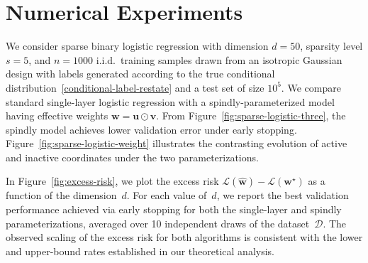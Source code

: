 \documentclass{article}
\theoremstyle{plain}
\theoremstyle{definition}
\theoremstyle{remark}
\begin{document}
 
 


\section{Numerical Experiments}


We consider sparse binary logistic regression with dimension $d=50$, sparsity level $s=5$, and $n=1000$ i.i.d.\ training samples drawn from an isotropic Gaussian design with labels generated according to the true conditional distribution~\eqref{conditional-label-restate} and a test set of size $10^{5}$. We compare standard single-layer logistic regression with a spindly-parameterized model having effective weights $\mathbf{w}=\mathbf{u}\odot\mathbf{v}$. From Figure~\ref{fig:sparse-logistic-three}, the spindly model achieves lower validation error under early stopping. Figure~\ref{fig:sparse-logistic-weight} illustrates the contrasting evolution of active and inactive coordinates under the two parameterizations.


In Figure~\ref{fig:excess-risk}, we plot the excess risk $\mathcal{L}(\hat{\mathbf w}) - \mathcal{L}(\mathbf w^\star)$ as a function of the dimension~$d$. For each value of~$d$, we report the best validation performance achieved via early stopping for both the single-layer and spindly parameterizations, averaged over 10 independent draws of the dataset~$\mathcal D$. The observed scaling of the excess risk for both algorithms is consistent with the lower and upper-bound rates established in our theoretical analysis.
\end{document}
